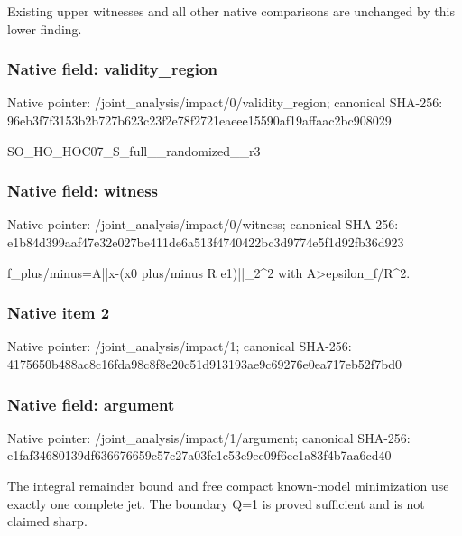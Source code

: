 \documentclass[10pt,a4paper]{article}
\begin{document}
\begingroup\raggedright\sloppy Existing upper witnesses and all other native comparisons are unchanged by this lower finding.\par\endgroup

\subsubsection{Native field: validity\_\allowbreak{}region}
Native pointer: /joint\_\allowbreak{}analysis/impact/0/validity\_\allowbreak{}region; canonical SHA-256: 96eb3f7f3153b2b727b623c23f2e78f2721eaeee15590af19affaac2bc908029

\begingroup\raggedright\sloppy SO\_\allowbreak{}HO\_\allowbreak{}HOC07\_\allowbreak{}S\_\allowbreak{}full\_\allowbreak{}\_\allowbreak{}randomized\_\allowbreak{}\_\allowbreak{}r3\par\endgroup

\subsubsection{Native field: witness}
Native pointer: /joint\_\allowbreak{}analysis/impact/0/witness; canonical SHA-256: e1b84d399aaf47e32e027be411de6a513f4740422bc3d9774e5f1d92fb36d923

\begingroup\raggedright\sloppy f\_\allowbreak{}plus/\allowbreak{}minus=\allowbreak{}A||x-(x0 plus/\allowbreak{}minus R e1)||\_\allowbreak{}2\textasciicircum{}2 with A>epsilon\_\allowbreak{}f/\allowbreak{}R\textasciicircum{}2.\par\endgroup

\subsubsection{Native item 2}
Native pointer: /joint\_\allowbreak{}analysis/impact/1; canonical SHA-256: 4175650b488ac8c16fda98c8f8e20c51d913193ae9c69276e0ea717eb52f7bd0

\subsubsection{Native field: argument}
Native pointer: /joint\_\allowbreak{}analysis/impact/1/argument; canonical SHA-256: e1faf34680139df636676659c57c27a03fe1c53e9ee09f6ec1a83f4b7aa6cd40

\begingroup\raggedright\sloppy The integral remainder bound and free compact known-model minimization use exactly one complete jet. The boundary Q=\allowbreak{}1 is proved sufficient and is not claimed sharp.\par\endgroup
\end{document}

